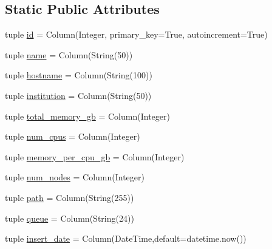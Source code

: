 \subsection*{\-Static \-Public \-Attributes}
\begin{DoxyCompactItemize}
\item 
tuple \hyperlink{classcyberweb_1_1model_1_1resource_1_1_resource_ad625a2803739087ed51372c847e68cbb}{id} = \-Column(\-Integer, primary\-\_\-key=\-True, autoincrement=\-True)
\item 
tuple \hyperlink{classcyberweb_1_1model_1_1resource_1_1_resource_aef8ab03dbaf1d496c9f774338e8f76b6}{name} = \-Column(\-String(50))
\item 
tuple \hyperlink{classcyberweb_1_1model_1_1resource_1_1_resource_ab45131a1566287845e922105eaef484b}{hostname} = \-Column(\-String(100))
\item 
tuple \hyperlink{classcyberweb_1_1model_1_1resource_1_1_resource_a08db9e029bcecdb06f0475ad81daee66}{institution} = \-Column(\-String(50))
\item 
tuple \hyperlink{classcyberweb_1_1model_1_1resource_1_1_resource_a0468564b34cf99a971add27ba17aa722}{total\-\_\-memory\-\_\-gb} = \-Column(\-Integer)
\item 
tuple \hyperlink{classcyberweb_1_1model_1_1resource_1_1_resource_a724fb44ed24795a8744ca793c61fd364}{num\-\_\-cpus} = \-Column(\-Integer)
\item 
tuple \hyperlink{classcyberweb_1_1model_1_1resource_1_1_resource_a60a998729e26729c721aa7641816a842}{memory\-\_\-per\-\_\-cpu\-\_\-gb} = \-Column(\-Integer)
\item 
tuple \hyperlink{classcyberweb_1_1model_1_1resource_1_1_resource_a705457c9454657b0f5d6a8f393fce95f}{num\-\_\-nodes} = \-Column(\-Integer)
\item 
tuple \hyperlink{classcyberweb_1_1model_1_1resource_1_1_resource_a7705a633cedfd9c7a5e0dd853ae54055}{path} = \-Column(\-String(255))
\item 
tuple \hyperlink{classcyberweb_1_1model_1_1resource_1_1_resource_acc3e0c62c1ebe65469608e78b976069a}{queue} = \-Column(\-String(24))
\item 
tuple \hyperlink{classcyberweb_1_1model_1_1resource_1_1_resource_a109a1d9d36401fb5bba09d050a14fe3f}{insert\-\_\-date} = \-Column(\-Date\-Time,default=datetime.\-now())
\end{DoxyCompactItemize}


